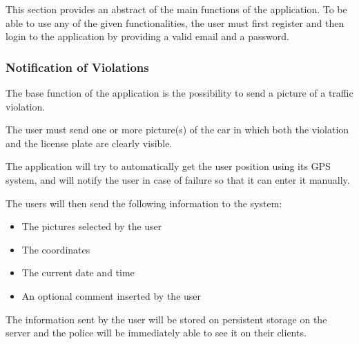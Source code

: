 This section provides an abstract of the main functions of the application. To be able to use any of the given functionalities, the user must first register and then login to the application by providing a valid email and a password.
\subsubsection{Notification of Violations}
The base function of the application is the possibility to send a picture of a traffic violation.

The user must send one or more picture(s) of the car in which both the violation and the license plate are clearly visible.

The application will try to automatically get the user position using its GPS system, and will notify the user in case of failure so that it can enter it manually.

The users will then send the following information to the system:
\begin{itemize}
    \item The pictures selected by the user
    \item The coordinates
    \item The current date and time
    \item An optional comment inserted by the user
\end{itemize}
The information sent by the user will be stored on persistent storage on the server and the police will be immediately able to see it on their clients.
